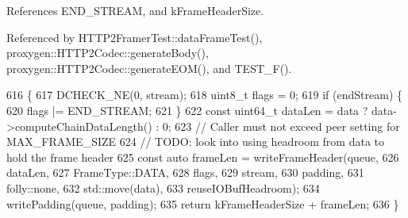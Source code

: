 References E\+N\+D\+\_\+\+S\+T\+R\+E\+AM, and k\+Frame\+Header\+Size.



Referenced by H\+T\+T\+P2\+Framer\+Test\+::data\+Frame\+Test(), proxygen\+::\+H\+T\+T\+P2\+Codec\+::generate\+Body(), proxygen\+::\+H\+T\+T\+P2\+Codec\+::generate\+E\+O\+M(), and T\+E\+S\+T\+\_\+\+F().


\begin{DoxyCode}
616                                             \{
617   DCHECK\_NE(0, stream);
618   uint8\_t flags = 0;
619   \textcolor{keywordflow}{if} (endStream) \{
620     flags |= END_STREAM;
621   \}
622   \textcolor{keyword}{const} uint64\_t dataLen = data ? data->computeChainDataLength() : 0;
623   \textcolor{comment}{// Caller must not exceed peer setting for MAX\_FRAME\_SIZE}
624   \textcolor{comment}{// TODO: look into using headroom from data to hold the frame header}
625   \textcolor{keyword}{const} \textcolor{keyword}{auto} frameLen = writeFrameHeader(queue,
626                                          dataLen,
627                                          FrameType::DATA,
628                                          flags,
629                                          stream,
630                                          padding,
631                                          folly::none,
632                                          std::move(data),
633                                          reuseIOBufHeadroom);
634   writePadding(queue, padding);
635   \textcolor{keywordflow}{return} kFrameHeaderSize + frameLen;
636 \}
\end{DoxyCode}
